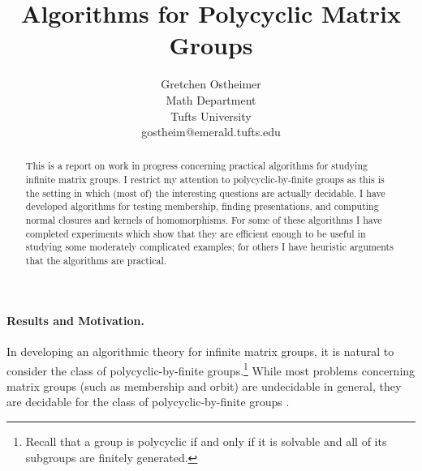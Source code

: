 

\newtheorem{theorem}{Theorem}[section]
\newtheorem{proposition}[theorem]{Proposition}
\newtheorem{lemma}[theorem]{Lemma}
\newtheorem{corollary}[theorem]{Corollary}
\newenvironment{hypothesis}{\em Hypothesis $(\dagger):$}{}
\newenvironment{proof}{{\em Proof.}}{$\Box$}
\newenvironment{proofy}{}{$\Box$}
\newcommand{\glq}[1]{\mbox{GL} (#1,{\bf Q})}
\newcommand{\glz}[1]{\mbox{GL} (#1,{\bf Z})}
\newcommand{\glv}[1]{\mbox{GL} (#1)}
\newcommand{\trq}[1]{\mbox{Tr}_1(#1,{\bf Q})}
\newcommand{\trz}[1]{\mbox{Tr}_1(#1,{\bf Z})}
\newcommand{\q}[1]{{\bf Q}^{#1}}
\newcommand{\z}[1]{{\bf Z}^{#1}}
\newcommand{\choo}[2]{\left( \begin{array}{c} #1 \\ #2 \end{array} \right)}
\title{Algorithms for Polycyclic Matrix Groups}
\author{Gretchen Ostheimer\\
        Math Department\\
        Tufts University\\
        gostheim@emerald.tufts.edu}

\maketitle

\begin{abstract}
This is a report on work in progress concerning
practical algorithms for studying infinite matrix groups.
I restrict my attention to polycyclic-by-finite 
groups as this is the setting in which (most of)
the interesting questions are actually decidable.
I have developed 
algorithms for testing membership, finding presentations, and
computing normal closures and  kernels of homomorphisms.
For some of these algorithms I have completed experiments which 
show that they are efficient enough to be
useful in studying some moderately 
complicated examples; for others I have heuristic
arguments that the algorithms are practical.
\end{abstract}

\paragraph{Results and Motivation.}
In developing an algorithmic theory for infinite
matrix groups, it is natural to consider the 
class of polycyclic-by-finite groups.\footnote{Recall 
that a group is polycyclic if and only
if it is solvable and all of its subgroups
are finitely generated.}
While most problems concerning 
matrix groups (such as membership and orbit)
are undecidable in general, 
they are decidable for the class of polycyclic-by-finite groups
\cite{BCRS}.

